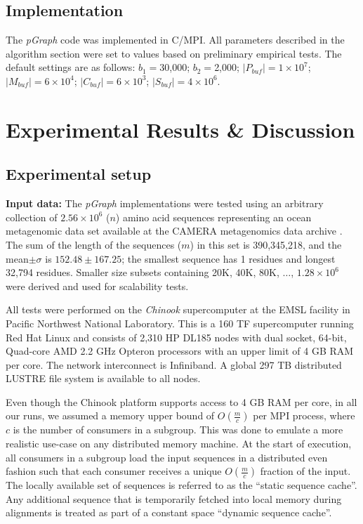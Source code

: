 \documentclass[10pt,journal,letterpaper,compsoc]{IEEEtran}
\begin{document}
\subsection{Implementation}
The {\it pGraph} code was implemented in C/MPI. All parameters described in the algorithm section were set to values based on preliminary empirical tests.  The default settings are as follows: $b_1=$30,000; $b_2=$2,000; $|P_{buf}|=1\times 10^7$; $|M_{buf}|=6\times 10^4$; $|C_{buf}|=6\times 10^3$; $|S_{buf}|=4\times 10^6$. 


\section{Experimental Results \& Discussion}
\label{secResults}


\subsection{Experimental setup} 


{\bf Input data:} The {\it pGraph} implementations were tested using an arbitrary collection of $2.56\times 10^6$ ($n$) amino acid sequences representing an ocean metagenomic data set available at the CAMERA metagenomics data archive \cite{}. The sum of the length of the sequences ($m$) in this set is 390,345,218, and the mean$\pm\sigma$ is $152.48\pm 167.25$; the smallest sequence has 1 residues and longest 32,794 residues. Smaller size subsets containing 20K, 40K, 80K, $\ldots$, $1.28\times 10^6$  were derived and used for scalability tests.


 All tests were performed on the {\it Chinook} supercomputer at the EMSL facility in Pacific Northwest National Laboratory. This is a 160 TF supercomputer running Red Hat Linux and consists of 2,310 HP DL185 nodes with dual socket, 64-bit, Quad-core AMD 2.2 GHz Opteron processors with an upper limit of 4 GB RAM per core. The network interconnect is Infiniband. A global 297 TB distributed LUSTRE file system is available to all nodes. 


 Even though the Chinook platform supports access to 4 GB RAM per core, in all our runs, we assumed a memory upper bound of $O(\frac{m}{c})$ per MPI process, where $c$ is the number of consumers in a subgroup. This was done to emulate a more realistic use-case on any distributed memory machine. At the start of execution, all consumers in a subgroup load the input sequences in a distributed even fashion such that each consumer receives a unique $O(\frac{m}{c})$ fraction of the input. The locally available set of sequences is referred to as the ``static sequence cache''. Any additional sequence that is temporarily fetched into local memory during alignments is treated as part of a constant space ``dynamic sequence cache''.
\end{document}
